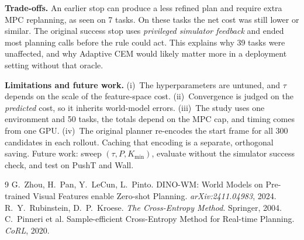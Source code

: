 \documentclass[10pt]{article}
\begin{document}
\textbf{Trade-offs.} An earlier stop can produce a less refined plan and require extra MPC replanning, as seen on 7 tasks. On
these tasks the net cost was still lower or similar. The original success stop uses \emph{privileged simulator feedback} and
ended most planning calls before the rule could act. This explains why 39 tasks were unaffected, and why Adaptive CEM
would likely matter more in a deployment setting without that oracle.

\textbf{Limitations and future work.}
(i)~The hyperparameters are untuned, and $\tau$ depends on the scale of the feature-space cost.
(ii)~Convergence is judged on the \emph{predicted} cost, so it inherits world-model errors.
(iii)~The study uses one environment and 50 tasks, the totals depend on the MPC cap, and timing comes from one GPU.
(iv)~The original planner re-encodes the start frame for all 300 candidates in each rollout. Caching that encoding is a separate,
orthogonal saving.
Future work: sweep $(\tau,P,K_{\min})$, evaluate without the simulator success check, and test on PushT and Wall.

\renewcommand{\refname}{\normalsize References}\vspace{-0.6em}
\begin{thebibliography}{9}\footnotesize\setlength{\itemsep}{0pt}\setlength{\parskip}{0pt}
 G.~Zhou, H.~Pan, Y.~LeCun, L.~Pinto.
  DINO-WM: World Models on Pre-trained Visual Features enable Zero-shot Planning. \emph{arXiv:2411.04983}, 2024.
 R.~Y.~Rubinstein, D.~P.~Kroese.
  \emph{The Cross-Entropy Method}. Springer, 2004.
 C.~Pinneri et al.
  Sample-efficient Cross-Entropy Method for Real-time Planning. \emph{CoRL}, 2020.
\end{thebibliography}
\end{document}
